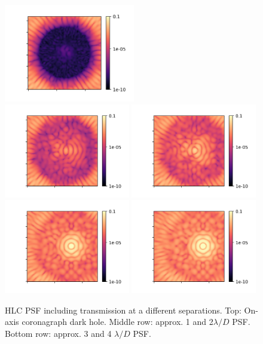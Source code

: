 \documentclass[]{spie}  %
\begin{document}
\begin{figure}
    \centering
    \includegraphics[width=0.51\textwidth]{0PSF.png}
    \includegraphics[width=0.49\textwidth]{17PSF_1lambdaD.png}
    \includegraphics[width=0.49\textwidth]{34PSF_2lambdaD.png}
    \includegraphics[width=0.49\textwidth]{51PSF.png}
    \includegraphics[width=0.49\textwidth]{68PSF.png}
    \caption{\acrshort{HLC} \gls{PSF} including transmission at a different separations. Top: On-axis coronagraph dark hole. Middle row: approx. 1 and 2$\lambda/D$ PSF. Bottom row: approx. 3 and 4 $\lambda/D$ PSF.}
    \label{fig:my_label}
\end{figure}
\end{document}
